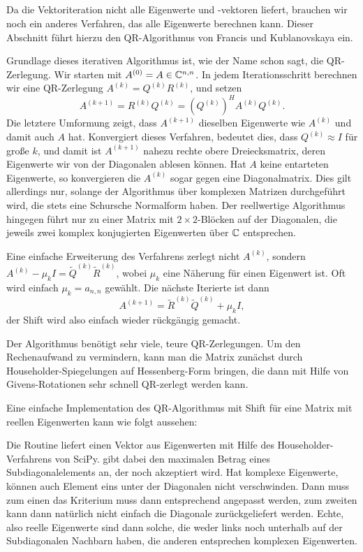 \subsection{}

Da die Vektoriteration nicht alle Eigenwerte und -vektoren liefert,
brauchen wir noch ein anderes Verfahren, das alle Eigenwerte berechnen
kann. Dieser Abschnitt führt hierzu den QR-Algorithmus von Francis und
Kublanovskaya ein.

Grundlage dieses iterativen Algorithmus ist, wie der Name schon sagt,
die QR-Zerlegung. Wir starten mit $A^{(0)} = A\in\mathbb{C}^{n,n}$. In jedem
Iterationsschritt berechnen wir eine QR-Zerlegung
$A^{(k)}=Q^{(k)}R^{(k)}$, und setzen
\begin{equation}
  A^{(k+1)} = R^{(k)}Q^{(k)} = \left(Q^{(k)}\right)^HA^{(k)}Q^{(k)}.
\end{equation}
Die letztere Umformung zeigt, dass $A^{(k+1)}$ dieselben Eigenwerte wie
$A^{(k)}$ und damit auch $A$ hat. Konvergiert dieses Verfahren,
bedeutet dies, dass $Q^{(k)}\approx I$ für große $k$, und damit ist
$A^{(k+1)}$ nahezu rechte obere Dreiecksmatrix, deren Eigenwerte wir
von der Diagonalen ablesen können. Hat $A$ keine entarteten
Eigenwerte, so konvergieren die $A^{(k)}$ sogar gegen eine
Diagonalmatrix. Dies gilt allerdings nur, solange der Algorithmus über
komplexen Matrizen durchgeführt wird, die stets eine Schursche
Normalform haben. Der reellwertige Algorithmus hingegen führt nur zu
einer Matrix mit $2\times 2$-Blöcken auf der Diagonalen, die jeweils
zwei komplex konjugierten Eigenwerten über $\mathbb{C}$ entsprechen.

Eine einfache Erweiterung des Verfahrens zerlegt nicht $A^{(k)}$,
sondern $A^{(k)} - \mu_kI = \tilde{Q}^{(k)}\tilde{R}^{(k)}$, wobei $\mu_k$ eine
Näherung für einen Eigenwert ist. Oft wird einfach $\mu_k = a_{n,n}$
gewählt. Die nächste Iterierte ist dann
\begin{equation}
  A^{(k+1)} = \tilde{R}^{(k)}\tilde{Q}^{(k)} + \mu_kI,
\end{equation}
der Shift wird also einfach wieder rückgängig gemacht.

Der Algorithmus benötigt sehr viele, teure QR-Zerlegungen. Um den
Rechenaufwand zu vermindern, kann man die Matrix zunächst durch
Householder-Spiegelungen auf Hessenberg-Form bringen, die dann mit
Hilfe von Givens-Rotationen sehr schnell QR-zerlegt werden kann.

Eine einfache Implementation des QR-Algorithmus mit Shift für eine
Matrix mit reellen Eigenwerten kann wie folgt aussehen:

Die Routine liefert einen Vektor aus Eigenwerten mit Hilfe des
Householder-Verfahrens von SciPy.  gibt dabei den
maximalen Betrag eines Subdiagonalelements an, der noch akzeptiert
wird.  Hat  komplexe Eigenwerte, können auch Element eins
unter der Diagonalen nicht verschwinden. Dann muss zum einen
das Kriterium muss dann entsprechend angepasst werden, zum zweiten
kann dann natürlich nicht einfach die Diagonale zurückgeliefert
werden. Echte, also reelle Eigenwerte sind dann solche, die weder
links noch unterhalb auf der Subdiagonalen Nachbarn haben, die anderen
entsprechen komplexen Eigenwerten.

